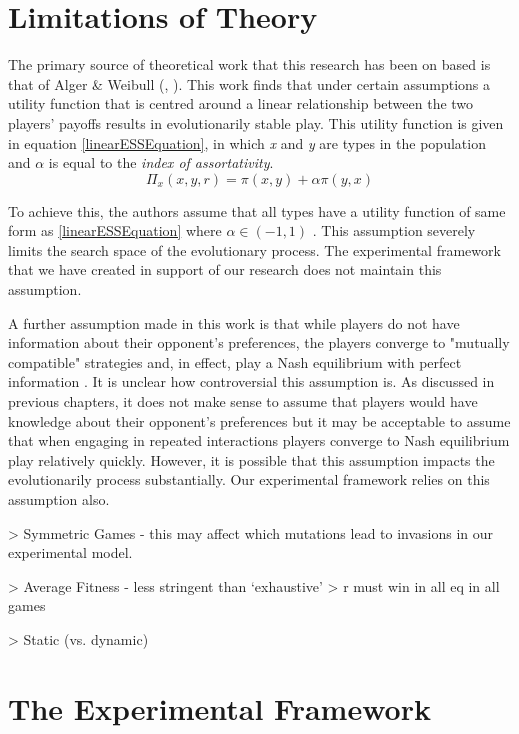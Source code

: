 \documentclass[11pt]{book}
\newcommand*{\np}{\par\noindent\newline}
\begin{document}
\section{Limitations of Theory}
\np The primary source of theoretical work that this research has been on based is that of Alger \& Weibull (\citet{alger_generalization_2012}, \citet{alger_homo_2013}).
This work finds that under certain assumptions a utility function that is centred around a linear relationship between the two players' payoffs results in evolutionarily stable play.
This utility function is given in equation \ref{linearESSEquation}, in which \textit{x} and \textit{y} are types in the population and $\alpha$ is equal to the \textit{index of assortativity}.
\begin{equation}
	\label{linearESSEquation}
	\Pi_x(x, y, r) = \pi(x,y) + \alpha\pi(y,x)
\end{equation}

\noindent To achieve this, the authors assume that all types have a utility function of same form as \ref{linearESSEquation} where $\alpha \in (-1, 1)$ \citep[p. ~47]{alger_generalization_2012}.
This assumption severely limits the search space of the evolutionary process. The experimental framework that we have created in support of our research does not maintain this assumption.

\np A further assumption made in this work is that while players do not have information about their opponent's preferences,
the players converge to "mutually compatible" strategies and, in effect, play a Nash equilibrium with perfect information \citep[p. ~46]{alger_generalization_2012}.
It is unclear how controversial this assumption is. 
As discussed in previous chapters, it does not make sense to assume that players would have knowledge about their opponent's preferences 
but it may be acceptable to assume that when engaging in repeated interactions players converge to Nash equilibrium play relatively quickly.
However, it is possible that this assumption impacts the evolutionarily process substantially. Our experimental framework relies on this assumption also.

\np > Symmetric Games - this may affect which mutations lead to invasions in our experimental model.

\np > Average Fitness - less stringent than `exhaustive' > r must win in all eq in all games 

\np > Static (vs. dynamic)


\section{The Experimental Framework}
\end{document}

